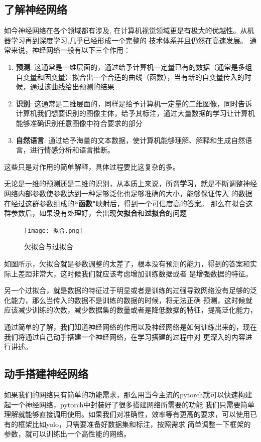 \subsection{了解神经网络}
如今神经网络在各个领域都有涉及, 在计算机视觉领域更是有极大的优越性。从机器学习再到深度学习,几乎已经形成一个完整的
技术体系并且仍然在高速发展。
通常来说，神经网络一般有以下三个作用：
\begin{enumerate}
    \item \textbf{预测}: 这通常是一维层面的，通过给予计算机一定量已有的数据（通常是多组自变量和因变量）拟合出一个合适的曲线（函数），当有新的自变量传入的时候，通过该曲线给出预测的结果
    \item \textbf{识别}: 这通常是二维层面的，同样是给予计算机一定量的二维图像，同时告诉计算机我们想要识别的图像主体，给予其标注，通过大量数据的学习让计算机能够准确识别任意图像中符合要求的部分
    \item \textbf{自然语言}: 通过给予海量的文本数据，使计算机能够理解、解释和生成自然语言，进行情感分析和语言推断。
\end{enumerate}
这些只是对作用的简单解释，具体过程要比这复杂的多。

无论是一维的预测还是二维的识别，从本质上来说，所谓\textbf{学习}，就是不断调整神经网络内部参数使参数达到一种足够泛化也足够准确的大小，能够保证传入
的数据在经过这群参数组成的\textbf{“函数"}映射后，得到一个可信度高的答案。
那么在拟合这群参数后，如果没有处理好，会出现\textbf{欠拟合}和\textbf{过拟合}的问题

\begin{figure}[h]
    \centering
    \texttt{[image: 拟合.png]}
    \caption{欠拟合与过拟合}
    \label{fig:拟合}
\end{figure}

如图所示，欠拟合就是参数调整的太差了，根本没有预测的能力，得到的答案和实际上差距非常大，这时候我们就应该考虑增加训练数据或者
是增强数据的特征。

另一个过拟合，就是数据的特征过于明显或者是训练的过强导致网络没有足够的泛化能力，那么当传入的数据不是训练的数据的时候，将无法正确
预测，这时候就应该减少训练的次数，减少数据集的数量或者是降低数据的特征，提高泛化能力，

通过简单的了解，我们知道神经网络的作用以及神经网络是如何训练出来的，现在我们将通过自己动手搭建一个神经网络，在学习搭建的过程中对
更深入的内容进行讲述。
\subsection{动手搭建神经网络}
如果我们的网络只有简单的功能需求，那么用当今主流的pytorch就可以快速构建起一个神经网络，pytorch中封装好了很多搭建网络所需要的功能
我们只需要简单理解就能够直接调用使用。如果我们对准确性，效率等有更高的要求，可以使用已有的框架比如yolo，只需要准备好数据集和标注，按照需求
简单调整一下框架的参数，就可以训练出一个高性能的网络。

